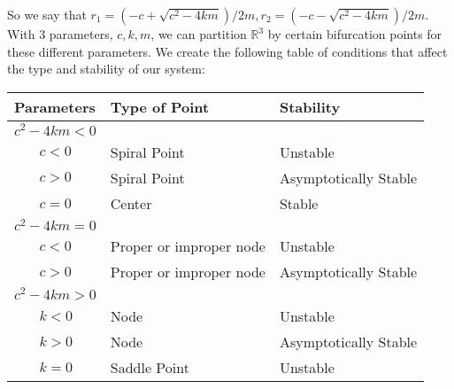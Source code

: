 \documentclass{article}
\theoremstyle{definition}
\begin{document}
    So we say that $r_1 = (-c + \sqrt{c^2 - 4km})/2m, r_2 = (-c - \sqrt{c^2 - 4km})/2m$.
    With 3 parameters, $c, k, m$, we can partition $\mathbb{R}^3$ by certain bifurcation points for 
    these different parameters. We create the following table of conditions that affect the type and stability
    of our system:
    \begin{center}
        \begin{tabular}{ | l | l | l | }
            \hline
        \textbf{Parameters}       & \textbf{Type of Point}           & \textbf{Stability}             \\
            \hline
        $c^2 - 4km < 0$  &                         &                       \\
        $\ \ \ \ \ \ \ \ c < 0$  & Spiral Point            & Unstable              \\
        $ \ \ \ \ \ \ \ \ c > 0$ & Spiral Point            & Asymptotically Stable \\
        $ \ \ \ \ \ \ \ \  c = 0$ & Center                  & Stable                \\
            \hline
        $c^2 - 4km = 0$  &                         &                       \\
        $\ \ \ \ \ \ \ \ c < 0$  & Proper or improper node & Unstable              \\
        $ \ \ \ \ \ \ \ \ c > 0$ & Proper or improper node & Asymptotically Stable \\
            \hline
        $c^2 - 4km > 0$  &                         &                       \\
        $ \ \ \ \ \ \ \ \ k < 0$ & Node                    & Unstable              \\
        $ \ \ \ \ \ \ \ \ k > 0$ & Node                    & Asymptotically Stable \\
        $ \ \ \ \ \ \ \ \ k = 0$ & Saddle Point            & Unstable            \\ 
            \hline
        \end{tabular}
    \end{center}
\end{document}
